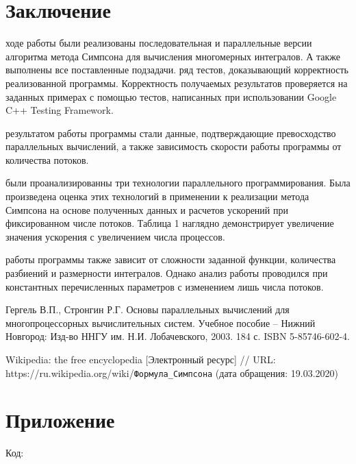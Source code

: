 \documentclass{report}
\begin{document}
\newpage

\section*{Заключение}


 ходе работы были реализованы последовательная и параллельные версии алгоритма метода Симпсона для вычисления многомерных интегралов. А также выполнены все поставленные подзадачи.
 ряд тестов, доказывающий корректность реализованной программы. Корректность получаемых результатов проверяется на заданных примерах с помощью тестов, написанных при использовании Google C++ Testing Framework. 

 результатом работы программы стали данные, подтверждающие превосходство параллельных вычислений, а также зависимость скорости работы программы от количества потоков.

 были проанализированны три технологии параллельного программирования. Была произведена оценка этих технологий в применении к реализации метода Симпсона на основе полученных данных и расчетов ускорений при фиксированном числе потоков. Таблица 1 наглядно демонстрирует увеличение значения ускорения с увеличением числа процессов.

 работы программы также зависит от сложности заданной функции, количества разбиений и размерности интегралов. Однако анализ работы проводился при константных перечисленных параметров с изменением лишь числа потоков.

\newpage

\begin{thebibliography}{1}

 Гергель В.П., Стронгин Р.Г. Основы параллельных вычислений для многопроцессорных вычислительных систем. Учебное пособие – Нижний Новгород: Изд-во ННГУ им. Н.И. Лобачевского, 2003. 184 с. ISBN 5-85746-602-4. 

 Wikipedia: the free encyclopedia [Электронный ресурс] // URL: https://ru.wikipedia.org/wiki/\verb|Формула_Симпсона| (дата обращения: 19.03.2020)

\end{thebibliography}
\newpage

\section*{Приложение}
Код:



\end{document}
